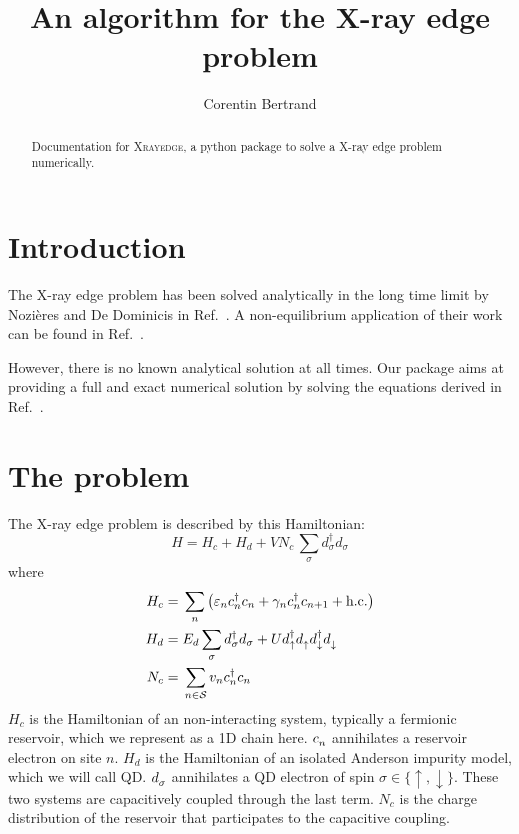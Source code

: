 \documentclass[12pt]{article}
\newcommand\up{\uparrow}
\newcommand\dn{\downarrow}
\newcommand\nodag{{\vphantom{\dagger}}}
\begin{document}
\title{An algorithm for the X-ray edge problem}
\author{Corentin Bertrand}

\maketitle

\begin{abstract}
    Documentation for \textsc{Xrayedge}, a python package to solve a X-ray edge problem numerically.
\end{abstract}



\begin{acronym}
\end{acronym}

\section{Introduction}

The X-ray edge problem has been solved analytically in the long time limit by Nozières and De Dominicis in Ref.~\cite{NozieresDeDominicis1969}.
A non-equilibrium application of their work can be found in Ref.~\cite{Aleiner1997}.

However, there is no known analytical solution at all times.
Our package aims at providing a full and exact numerical solution by solving the equations derived in Ref.~\cite{NozieresDeDominicis1969}.

\section{The problem}

The X-ray edge problem is described by this Hamiltonian:
\begin{equation}
	H = H_c + H_d + V N_c \, \sum_{\sigma} d_\sigma^\dagger d_\sigma
\end{equation}
where
\begin{align}
	H_c ={}& \sum_n \qty( \varepsilon_n c_n^\dagger c_n + \gamma_n c_n^\dagger c_{n+1} + \text{h.c.})
	\\
	H_d ={}& E_d \sum_{\sigma} d_\sigma^\dagger d_\sigma + U d_\up^\dag d_\up^\nodag d_\dn^\dag d_\dn^\nodag
	\\
	N_c ={}& \sum_{n \in \mathcal{S}} v_n c_n^\dag c_n
\end{align}
$H_c$ is the Hamiltonian of an non-interacting system, typically a fermionic reservoir, which we represent as a 1D chain here. $c_n^\nodag$ annihilates a reservoir electron on site $n$.
$H_d$ is the Hamiltonian of an isolated Anderson impurity model, which we will call \ac{QD}.
$d_\sigma^\nodag$ annihilates a \ac{QD} electron of spin $\sigma \in \{\up, \dn\}$.
These two systems are capacitively coupled through the last term. $N_c$ is the charge distribution of the reservoir that participates to the capacitive coupling.
\end{document}
